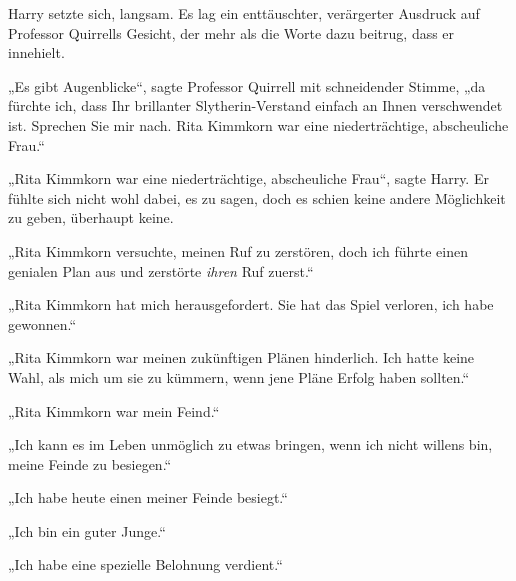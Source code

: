 Harry setzte sich, langsam. Es lag ein enttäuschter, verärgerter Ausdruck auf Professor Quirrells Gesicht, der mehr als die Worte dazu beitrug, dass er innehielt.

„Es gibt Augenblicke“, sagte Professor Quirrell mit schneidender Stimme, „da fürchte ich, dass Ihr brillanter Slytherin-Verstand einfach an Ihnen verschwendet ist. Sprechen Sie mir nach. Rita Kimmkorn war eine niederträchtige, abscheuliche Frau.“

„Rita Kimmkorn war eine niederträchtige, abscheuliche Frau“, sagte Harry. Er fühlte sich nicht wohl dabei, es zu sagen, doch es schien keine andere Möglichkeit zu geben, überhaupt keine.

„Rita Kimmkorn versuchte, meinen Ruf zu zerstören, doch ich führte einen genialen Plan aus und zerstörte \emph{ihren} Ruf zuerst.“

„Rita Kimmkorn hat mich herausgefordert. Sie hat das Spiel verloren, ich habe gewonnen.“

„Rita Kimmkorn war meinen zukünftigen Plänen hinderlich. Ich hatte keine Wahl, als mich um sie zu kümmern, wenn jene Pläne Erfolg haben sollten.“

„Rita Kimmkorn war mein Feind.“

„Ich kann es im Leben unmöglich zu etwas bringen, wenn ich nicht willens bin, meine Feinde zu besiegen.“

„Ich habe heute einen meiner Feinde besiegt.“

„Ich bin ein guter Junge.“

„Ich habe eine spezielle Belohnung verdient.“

